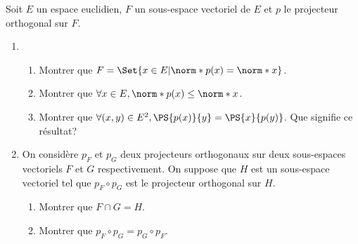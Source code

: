 \begin{enonce}
\begin{exercise}[ID={RMS133 E1299},subtitle={CCINP MP 2022},tags={},difficulty={}]
Soit $E$ un espace euclidien, $F$ un sous-espace vectoriel de $E$ et $p$ le projecteur orthogonal sur $F$.
\begin{enumerate}
  \item 
    \begin{enumerate}
      \item Montrer que $F=\Set{x\in E | \norm*{p(x)} = \norm*{x}}$.
      \item Montrer que $\forall x\in E, \norm*{p(x)} \leq \norm*{x}$.
      \item Montrer que $\forall (x,y)\in E^2, \PS{p(x)}{y} = \PS{x}{p(y)}$. Que signifie ce résultat?
    \end{enumerate}

  \item On considère $p_F$ et $p_G$ deux projecteurs orthogonaux sur deux sous-espaces vectoriels $F$ et $G$ respectivement.
    On suppose que $H$ est un sous-espace vectoriel tel que $p_F\circ p_G$ est le projecteur orthogonal sur $H$.

    \begin{enumerate}
      \item Montrer que $F\cap G = H$.
      \item Montrer que $p_F \circ p_G = p_G \circ p_F$.
    \end{enumerate}

\end{enumerate}
\end{exercise}
\begin{solution}
\end{solution}
\end{enonce}

